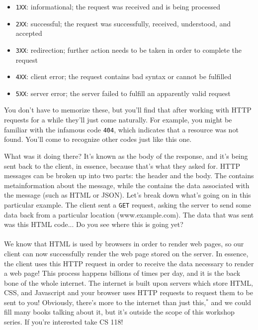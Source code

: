 \begin{itemize}
    \item \texttt{1XX}: informational; the request was received and is being processed
    \item \texttt{2XX}: successful; the request was successfully, received, understood, and accepted
    \item \texttt{3XX}: redirection; further action needs to be taken in order to complete the request
    \item \texttt{4XX}: client error; the request contains bad syntax or cannot be fulfilled
    \item \texttt{5XX}: server error; the server failed to fulfill an apparently valid request
\end{itemize}



You don't have to memorize these, but you'll find that after working with HTTP requests for a while they'll just come naturally. For example, you might be familiar with the infamous code \texttt{404}, which indicates that a resource was not found. You'll come to recognize other codes just like this one.

\begin{kaobox}[title=About the HTML we saw before\dots]
    What was it doing there? It's known as the body of the response, and it's being sent back to the client, in essence, because that's what they asked for. HTTP messages can be broken up into two parts: the header and the body. The  contains metainformation about the message, while the  contains the data associated with the message (such as HTML or JSON). Let's break down what's going on in this particular example.  The client sent a \texttt{GET} request, asking the server to send some data back from a particular location (www.example.com). The data that was sent was this HTML code... Do you see where this is going yet? \\ \\
    We know that HTML is used by browsers in order to render web pages, so our client can now successfully render the web page stored on the server. In essence, the client uses this HTTP request in order to receive the data necessary to render a web page! This process happens billions of times per day, and it is the back bone of the whole internet. The internet is built upon servers which store HTML, CSS, and Javascript and your browser uses HTTP requests to request them to be sent to you! Obviously, there's more to the internet than just this,$^*$ and we could fill many books talking about it, but it's outside the scope of this workshop series. If you're interested take CS 118!
\end{kaobox}

